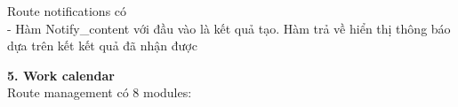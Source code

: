 \documentclass[a4paper]{article}
\begin{document}
\begin{itemize}
\begin{minipage}[b]{0.4\textwidth}
Route notifications có\\
- Hàm Notify\_content  với đầu vào là kết quả tạo. Hàm trả về hiển thị thông báo dựa trên kết kết quả đã nhận được
\end{minipage}
\hfill
{}
\newline
\newline
\textbf{    5. Work calendar } \\
    Route management có 8 modules:
    \begin{itemize}
     

\end{itemize}
\end{itemize}
\end{document}
